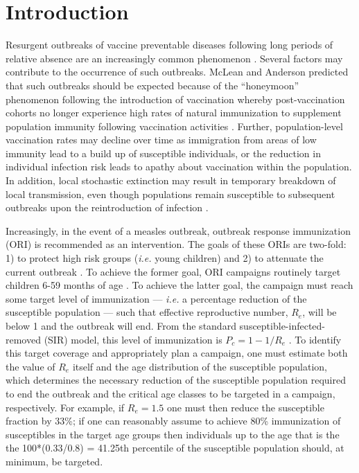 \section{Introduction}\label{introduction}

Resurgent outbreaks of vaccine preventable diseases following long periods of
relative absence are an increasingly common phenomenon \cite{Hersh_1991, Cherry_2012, Celentano_2005, Shibeshi_2014}. Several factors may contribute to the occurrence of
such outbreaks. McLean and Anderson \cite{McLean_1988} predicted that such
outbreaks should be expected because of the ``honeymoon'' phenomenon
following the introduction of vaccination whereby post-vaccination
cohorts no longer experience high rates of natural immunization to
supplement population immunity following vaccination activities \cite{Jansen_2003}. Further, population-level vaccination rates may
decline over time as immigration from areas of low immunity lead to a build up of susceptible individuals, or the reduction in individual infection risk \cite{Omer_2009} leads to apathy about vaccination within the population. In addition, local stochastic
extinction may result in temporary breakdown of local transmission, even
though populations remain susceptible to subsequent outbreaks upon the
reintroduction of infection \cite{Ferrari_2008}.

Increasingly, in the event of a measles outbreak, outbreak response
immunization (ORI) is recommended as an intervention. The goals of
these ORIs are two-fold: 1) to protect high risk groups (\emph{i.e.}
young children) and 2) to attenuate the current outbreak \cite{Cairns_2011,Grais_2011} . To achieve the former goal, ORI campaigns routinely
target children 6-59 months of age \cite{Cairns_2011}. To achieve the latter goal, the campaign must reach some
target level of immunization --- \emph{i.e.} a percentage reduction of
the susceptible population --- such that effective reproductive number,
\(R_e\), will be below 1 and the outbreak will end. From the standard susceptible-infected-removed (SIR)
model, this level of immunization is \(P_c = 1-1/R_e\) \cite{Anderson_1981}. To identify this target coverage and appropriately plan a campaign, one must estimate
both the value of \(R_e\) itself and the age distribution of the
susceptible population, which determines the necessary reduction of
the susceptible population required to end the outbreak and the
critical age classes to be targeted in a campaign, respectively.
For example, if \(R_e=1.5\) one must then reduce the
susceptible fraction by 33\%; if one can reasonably assume to achieve
80\% immunization of susceptibles in the target age groups then individuals up to the age that is the the
100*(0.33/0.8) = 41.25th percentile of the susceptible population should, at minimum, be targeted.

